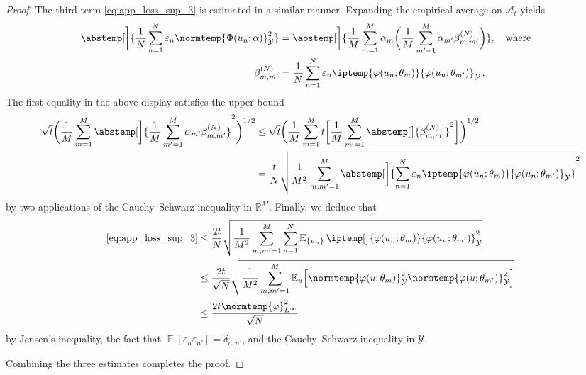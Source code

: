 \documentclass{article}
\theoremstyle{plain}
\theoremstyle{my_def}
\theoremstyle{my_rem}
\numberwithin{equation}{section}
\numberwithin{theorem}{section}%
\newcommand{\R}{\mathbb{R}}
\newcommand{\E}{\mathbb{E}}
\newcommand{\cA}{\mathcal{A}}
\newcommand{\cY}{\mathcal{Y}}
\newcommand{\ip}{\iptemp}
\newcommand{\norm}{\normtemp}
\newcommand{\abs}{\abstemp}
\renewcommand{\E}{\operatorname{\mathbb{E}}} %
\newcommand{\al}{\alpha}
\def\qw{\quad\text{where}\quad}
\newcommand{\U}{{\{u_n\}}}
\newcommand{\eps}{\varepsilon}
\renewcommand{\phi}{\varphi}
\begin{document}
\begin{proof}
    The third term \eqref{eq:app_loss_sup_3} is estimated in a similar manner. Expanding the empirical average on $\cA_t$ yields
    \begin{align*}
        \abs[\bigg]{\frac{1}{N}\sum_{n=1}^N\eps_n\norm{\Phi(u_n;\al)}_{\cY}^2}&=\abs[\bigg]{\frac{1}{M}\sum_{m=1}^M\al_m\biggl(\frac{1}{M}\sum_{m'=1}^M\al_{m'}\beta_{m,m'}^{(N)}\biggr)},\qw \\
        \beta_{m,m'}^{(N)}&=\frac{1}{N}\sum_{n=1}^N\eps_n\ip{\phi(u_n;\theta_m)}{\phi(u_n;\theta_{m'})}_{\cY}\,.
    \end{align*}
    The first equality in the above display satisfies the upper bound
    \begin{align*}
        \sqrt{t}\biggl(\frac{1}{M}\sum_{m=1}^M\abs[\bigg]{\frac{1}{M}\sum_{m'=1}^M\al_{m'}\beta_{m,m'}^{(N)}}^2\biggr)^{1/2}
        &\leq\sqrt{t}\biggl(\frac{1}{M}\sum_{m=1}^M t \biggl[\frac{1}{M}\sum_{m'=1}^M\abs[\big]{\beta_{m,m'}^{(N)}}^2\biggr]\biggr)^{1/2}\\
        &=\frac{t}{N}\sqrt{\frac{1}{M^2}\sum_{m,m'=1}^M\abs[\bigg]{\sum_{n=1}^N\eps_n\ip{\phi(u_n;\theta_m)}{\phi(u_n;\theta_{m'})}_{\cY}}^2}
    \end{align*}
    by two applications of the Cauchy--Schwarz inequality in $\R^M$. Finally, we deduce that
    \begin{align*}
        \eqref{eq:app_loss_sup_3}&\leq \frac{2t}{N}\sqrt{\frac{1}{M^2}\sum_{m,m'=1}^M\sum_{n=1}^N\E_{\U}\ip[\big]{\phi(u_n;\theta_m)}{\phi(u_n;\theta_{m'})}_{\cY}^2}\\
        &\leq \frac{2t}{\sqrt{N}}\sqrt{\frac{1}{M^2}\sum_{m,m'=1}^M\E_{u}\Bigl[\norm{\phi(u;\theta_m)}_{\cY}^2\norm{\phi(u;\theta_{m'})}_{\cY}^2\Bigr]}\\
        &\leq \frac{2t\norm{\phi}_{L^\infty}^2}{\sqrt{N}}
    \end{align*}
    by Jensen's inequality, the fact that $\E[\eps_n\eps_{n'}]=\delta_{n,n'}$, and the Cauchy--Schwarz inequality in $\cY$.

    Combining the three estimates completes the proof.
\end{proof}
\end{document}
